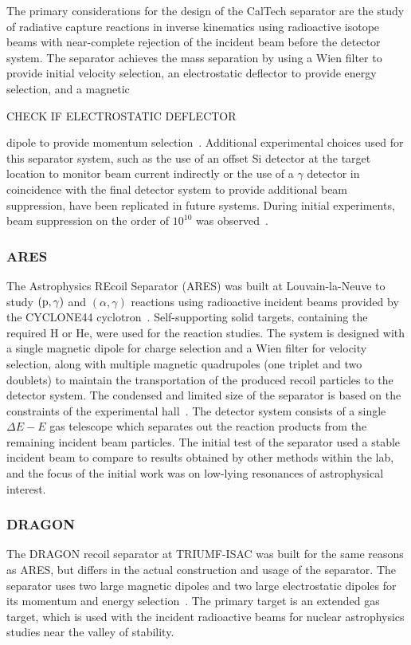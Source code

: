 The primary considerations for the design of the CalTech separator are
the study of radiative capture reactions in inverse kinematics using
radioactive isotope beams with near-complete rejection of the incident
beam before the detector system. The separator achieves the mass
separation by using a Wien filter to provide initial velocity selection,
an electrostatic deflector to provide energy selection, and a magnetic

CHECK IF ELECTROSTATIC DEFLECTOR

dipole to provide momentum selection~\cite{Smith1991}. Additional
experimental choices used for this separator system, such as the use of
an offset Si detector at the target location to monitor beam current
indirectly or the use of a $\gamma$ detector in coincidence with the
final detector system to provide additional beam suppression, have been
replicated in future systems. During initial experiments, beam
suppression on the order of $10^{10}$ was observed~\cite{Smith1991}.

\subsubsection{ARES}
The Astrophysics REcoil Separator (ARES) was built at Louvain-la-Neuve
to study $(\rm{p},\gamma)$ and $(\alpha,\gamma)$ reactions using
radioactive incident beams provided by the CYCLONE44
cyclotron~\cite{Angulo2001}. Self-supporting solid targets, containing
the required H or He, were used for the reaction studies. The system is
designed with a single magnetic dipole for charge selection and a Wien
filter for velocity selection, along with multiple magnetic quadrupoles
(one triplet and two doublets) to maintain the transportation of the
produced recoil particles to the detector system. The condensed and
limited size of the separator is based on the constraints of the
experimental hall~\cite{Couder2003}. The detector system consists of a
single $\Delta E - E$ gas telescope which separates out the reaction
products from the remaining incident beam particles. The initial test of
the separator used a stable incident beam to compare to results obtained
by other methods within the lab, and the focus of the initial work was
on low-lying resonances of astrophysical interest.

\subsubsection{DRAGON}
The DRAGON recoil separator at TRIUMF-ISAC was built for the same
reasons as ARES, but differs in the actual construction and usage of the
separator. The separator uses two large magnetic dipoles and two large
electrostatic dipoles for its momentum and energy
selection~\cite{Engel2005}. The primary target is an extended gas
target, which is used with the incident radioactive beams for nuclear
astrophysics studies near the valley of stability.

